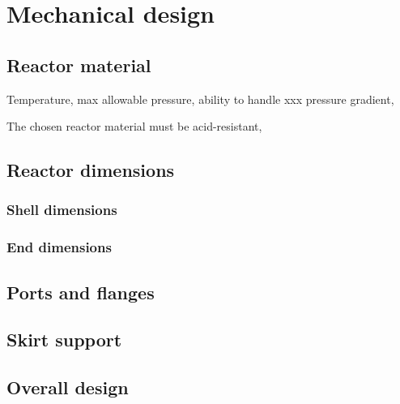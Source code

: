 \section{Mechanical design}
\subsection{Reactor material}
Temperature, max allowable pressure, ability to handle xxx pressure gradient, 

The chosen reactor material must be acid-resistant, 
\subsection{Reactor dimensions}
\subsubsection{Shell dimensions}
\subsubsection{End dimensions}
\subsection{Ports and flanges}
\subsection{Skirt support}
\subsection{Overall design}

